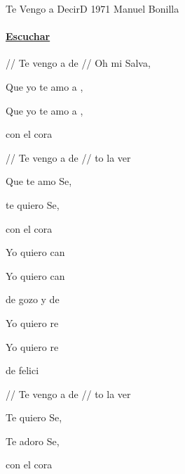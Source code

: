 \documentclass[12pt, spanish]{book}
\begin{document}
    \begin{song}{Te Vengo a Decir}{D}
    {1971} %
    {Manuel Bonilla}
    {} %
    {}
        \ifChordBk
        \paragraph{\mbox{}\hfill\protect\href{https://open.spotify.com/intl-es/track/62LUygH2lO3jERbY0i9xc0}{Escuchar}\mbox{}\hfill}
        \fi

        \begin{SBOpGroup}
            // Te vengo a de // Oh mi Salva,

            Que yo te amo a ,

            Que yo te amo a ,

            con el cora

            // Te vengo a de // to la ver
        \end{SBOpGroup}

        \begin{SBChorus}
            Que te amo Se,

            te quiero Se,

            con el cora
        \end{SBChorus}

        \begin{SBOpGroup}
            Yo quiero can

            Yo quiero can

            de gozo y de 

            Yo quiero re

            Yo quiero re

            de felici

            // Te vengo a de // to la ver
        \end{SBOpGroup}

        \begin{SBChorus}
            Te quiero Se,

            Te adoro Se,

            con el cora
        \end{SBChorus}


\end{song}
\end{document}
